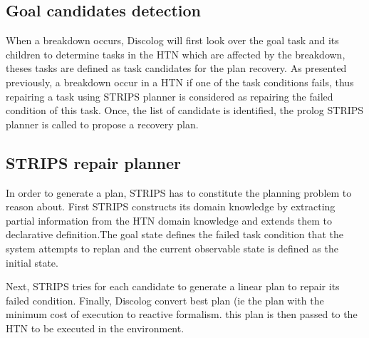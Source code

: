 \subsection{Goal candidates detection}
When a breakdown occurs, Discolog  will  first look over the goal task and its children to determine tasks in the HTN which are affected by the breakdown, theses tasks are defined as task candidates for the plan recovery.
As presented previously, a breakdown occur in a HTN if one of the task conditions fails, thus repairing a task using STRIPS planner is considered as repairing the failed condition of this task.
Once, the list of candidate is identified, the prolog STRIPS planner is called to propose a recovery plan.
\subsection{STRIPS repair planner}
In order to generate a plan, STRIPS has to constitute the planning problem to reason about. First  STRIPS constructs its domain knowledge by extracting partial information from the HTN domain knowledge and extends them to declarative definition.The goal state defines  the failed task condition that  the system attempts to replan  and the current observable state is defined as the initial state.

Next, STRIPS tries for each candidate to generate a linear plan to repair its failed condition. Finally, Discolog convert best plan (ie the plan with the minimum cost of execution  to reactive formalism. this plan is then passed to the HTN to be executed in the environment.


